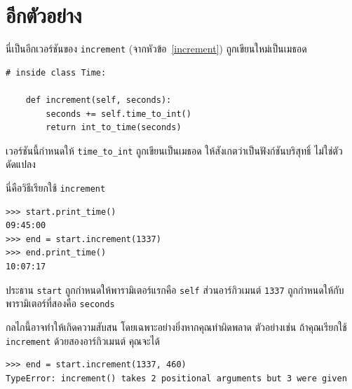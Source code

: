 \section{อีกตัวอย่าง} %


นี่เป็นอีกเวอร์ชันของ {\tt increment} (จากหัวข้อ~\ref{increment}) ถูกเขียนใหม่เป็นเมธอด

\begin{verbatim}
# inside class Time:

    def increment(self, seconds):
        seconds += self.time_to_int()
        return int_to_time(seconds)
\end{verbatim}
%

เวอร์ชันนี้กำหนดให้ \verb"time_to_int" ถูกเขียนเป็นเมธอด ให้สังเกตว่าเป็นฟังก์ชันบริสุทธิ์ ไม่ใช่ตัวดัดแปลง


นี่คือวิธีเรียกใช้ {\tt increment}

\begin{verbatim}
>>> start.print_time()
09:45:00
>>> end = start.increment(1337)
>>> end.print_time()
10:07:17
\end{verbatim}
%

ประธาน {\tt start} ถูกกำหนดให้พารามิเตอร์แรกคือ {\tt self} ส่วนอาร์กิวเมนต์ {\tt 1337} ถูกกำหนดให้กับพารามิเตอร์ที่สองคือ {\tt seconds}


กลไกนี้อาจทำให้เกิดความสับสน โดยเฉพาะอย่างยิ่งหากคุณทำผิดพลาด ตัวอย่างเช่น ถ้าคุณเรียกใช้ {\tt increment} ด้วยสองอาร์กิวเมนต์ คุณจะได้


\begin{verbatim}
>>> end = start.increment(1337, 460)
TypeError: increment() takes 2 positional arguments but 3 were given
\end{verbatim}
%

